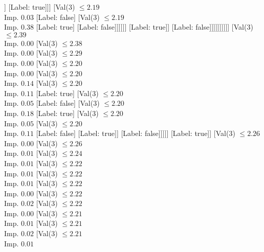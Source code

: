 \documentclass[margin=10pt]{standalone}
\begin{document}
\begin{forest}
																							]
																						[Label: true]]]
																				[Val($3$) $ \leq 2.19$ \\ Imp. $0.03$
																					[Label: false]
																					[Val($3$) $ \leq 2.19$ \\ Imp. $0.38$
																						[Label: true]
																						[Label: false]]]]]]
																	[Label: true]]
																[Label: false]]]]]]]]]]
							[Val($3$) $ \leq 2.39$ \\ Imp. $0.00$
								[Val($3$) $ \leq 2.38$ \\ Imp. $0.00$
									[Val($3$) $ \leq 2.29$ \\ Imp. $0.00$
										[Val($3$) $ \leq 2.20$ \\ Imp. $0.00$
											[Val($3$) $ \leq 2.20$ \\ Imp. $0.14$
												[Val($3$) $ \leq 2.20$ \\ Imp. $0.11$
													[Label: true]
													[Val($3$) $ \leq 2.20$ \\ Imp. $0.05$
														[Label: false]
														[Val($3$) $ \leq 2.20$ \\ Imp. $0.18$
															[Label: true]
															[Val($3$) $ \leq 2.20$ \\ Imp. $0.05$
																[Val($3$) $ \leq 2.20$ \\ Imp. $0.11$
																	[Label: false]
																	[Label: true]]
																[Label: false]]]]]
												[Label: true]]
											[Val($3$) $ \leq 2.26$ \\ Imp. $0.00$
												[Val($3$) $ \leq 2.26$ \\ Imp. $0.01$
													[Val($3$) $ \leq 2.24$ \\ Imp. $0.01$
														[Val($3$) $ \leq 2.22$ \\ Imp. $0.01$
															[Val($3$) $ \leq 2.22$ \\ Imp. $0.01$
																[Val($3$) $ \leq 2.22$ \\ Imp. $0.00$
																	[Val($3$) $ \leq 2.22$ \\ Imp. $0.02$
																		[Val($3$) $ \leq 2.22$ \\ Imp. $0.00$
																			[Val($3$) $ \leq 2.21$ \\ Imp. $0.01$
																				[Val($3$) $ \leq 2.21$ \\ Imp. $0.02$
																					[Val($3$) $ \leq 2.21$ \\ Imp. $0.01$

\end{forest}
\end{document}

